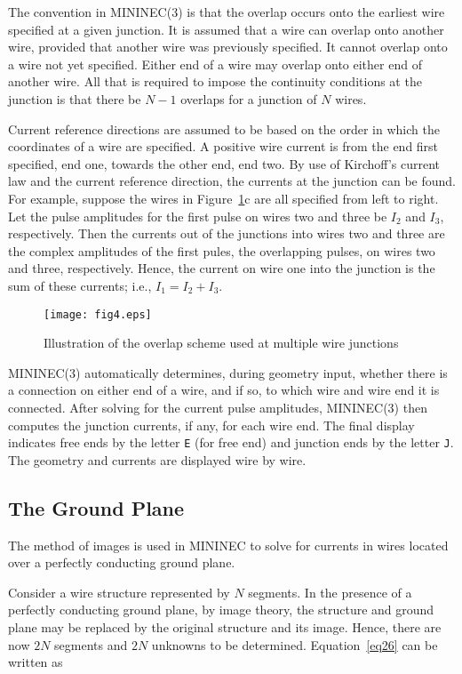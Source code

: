 \documentclass[12pt]{article}
\begin{document}
The convention in MININEC(3) is that the overlap occurs onto the
earliest wire specified at a given junction. It is assumed that a wire
can overlap onto another wire, provided that another wire was previously
specified. It cannot overlap onto a wire not yet specified. Either end
of a wire may overlap onto either end of another wire. All that is
required to impose the continuity conditions at the junction is that
there be $N-1$ overlaps for a junction of $N$ wires.

Current reference directions are assumed to be based on the order in
which the coordinates of a wire are specified. A positive wire current
is from the end first specified, end one, towards the other end, end
two. By use of Kirchoff's current law and the current reference
direction, the currents at the junction can be found. For example,
suppose the wires in Figure~\ref{fig4}c are all specified from left to
right. Let the pulse amplitudes for the first pulse on wires two and
three be $I_2$ and $I_3$, respectively. Then the currents out of the
junctions into wires two and three are the complex amplitudes of the
first pules, the overlapping pulses, on wires two and three,
respectively. Hence, the current on wire one into the junction is the
sum of these currents; i.e., $I_1=I_2+I_3$.

\begin{figure}[htb]
\centerline{\texttt{[image: fig4.eps]}}
\caption{Illustration of the overlap scheme used at multiple wire junctions}
\label{fig4}
\end{figure}

MININEC(3) automatically determines, during geometry input, whether
there is a connection on either end of a wire, and if so, to which wire
and wire end it is connected. After solving for the current pulse
amplitudes, MININEC(3) then computes the junction currents, if any, for
each wire end. The final display indicates free ends by the letter
\verb+E+ (for free end) and junction ends by the letter \verb+J+. The
geometry and currents are displayed wire by wire.

\subsection{The Ground Plane}
\label{sec-groundplane}

The method of images is used in MININEC to solve for currents in wires
located over a perfectly conducting ground plane.

Consider a wire structure represented by $N$ segments. In the presence
of a perfectly conducting ground plane, by image theory, the structure
and ground plane may be replaced by the original structure and its
image. Hence, there are now $2N$ segments and $2N$ unknowns to be
determined. Equation~\eqref{eq26} can be written as
\end{document}
